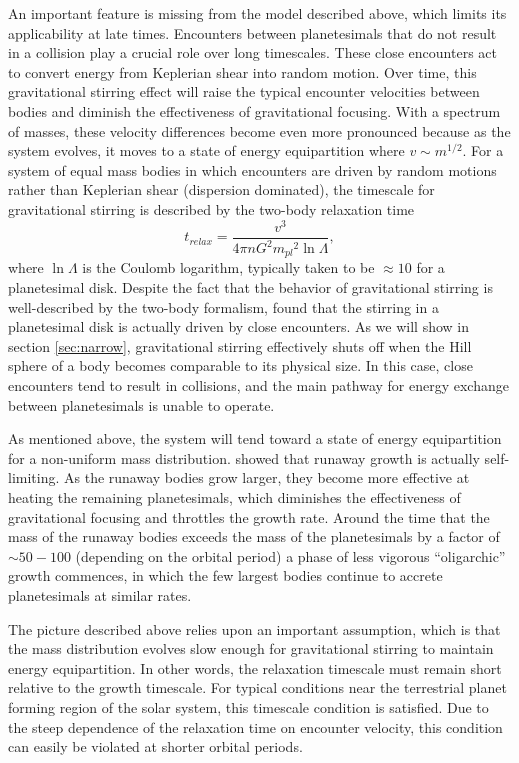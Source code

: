 \documentclass[twocolumn]{aastex63}
\begin{document}
An important feature is missing from the model described above, which
limits its applicability at late times. Encounters between
planetesimals that do not result in a collision play a crucial role
over long timescales. These close encounters act to convert energy
from Keplerian shear into random motion. Over time, this gravitational
stirring effect will raise the typical encounter velocities between
bodies and diminish the effectiveness of gravitational focusing. With
a spectrum of masses, these velocity differences become even more
pronounced because as the system evolves, it moves to a state of
energy equipartition where $v \sim m^{1/2}$. For a system of equal mass bodies in which encounters are driven by random motions rather than Keplerian shear (dispersion dominated), the timescale for gravitational stirring is described by the two-body relaxation time \citep{ida93}
\begin{equation}\label{eq:relax}
	t_{relax} = \frac{v^3}{4 \pi n G^2 {m_{pl}}^2 \ln \Lambda},
\end{equation}
where $\ln \Lambda$ is the Coulomb logarithm,
typically taken to be $\approx 10$ for a planetesimal disk. Despite
the fact that the behavior of gravitational stirring is well-described
by the two-body formalism, \citep{ida93} found that the stirring in a planetesimal disk is actually driven by close encounters. As we will show in section \ref{sec:narrow}, gravitational stirring effectively shuts off when the Hill sphere of a body becomes comparable to its physical size. In this case, close encounters tend to result in collisions, and the main pathway for energy exchange between planetesimals is unable to operate.

As mentioned above, the system will tend toward a state of energy
equipartition for a non-uniform mass distribution. \citet{kokubo98}
showed that runaway growth is actually self-limiting. As the runaway
bodies grow larger, they become more effective at heating the
remaining planetesimals, which diminishes the effectiveness of
gravitational focusing and throttles the growth rate. Around the time
that the mass of the runaway bodies exceeds the mass of the planetesimals
by a factor of $\sim 50-100$ (depending on the orbital period)
\citep{ida93} a phase of less vigorous ``oligarchic'' 
growth commences, in which the few largest bodies continue to 
accrete planetesimals at similar rates.

The picture described above relies upon an important assumption, which is that the mass distribution evolves slow enough for gravitational stirring to maintain energy equipartition. In other words, the relaxation timescale must remain short relative to the growth timescale. For typical conditions near the terrestrial planet forming region of the solar system, this timescale condition is satisfied. Due to the steep dependence of the relaxation time on encounter velocity, this condition can easily be violated at shorter orbital periods.
\end{document}
